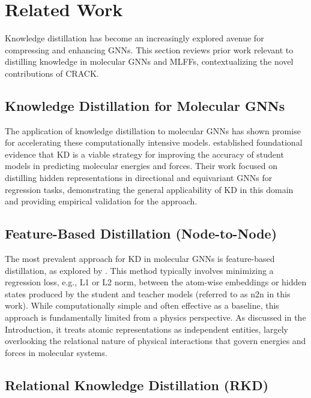 \documentclass{article}
\begin{document}
\section{Related Work}

Knowledge distillation has become an increasingly explored avenue for compressing and enhancing GNNs. This section reviews prior work relevant to distilling knowledge in molecular GNNs and MLFFs, contextualizing the novel contributions of CRACK.


\subsection{Knowledge Distillation for Molecular GNNs}

The application of knowledge distillation to molecular GNNs has shown promise for accelerating these computationally intensive models. 
\citet{ekstrom2023accelerating} established foundational evidence that KD is a viable strategy for improving the accuracy of student models in predicting molecular energies and forces. 
Their work focused on distilling hidden representations in directional and equivariant GNNs for regression tasks, demonstrating the general applicability of KD in this domain and providing empirical validation for the approach.


\subsection{Feature-Based Distillation (Node-to-Node)}

The most prevalent approach for KD in molecular GNNs is feature-based distillation, as explored by \citet{ekstrom2023accelerating}. This method typically involves minimizing a regression loss, e.g., L1 or L2 norm, between the atom-wise embeddings or hidden states produced by the student and teacher models (referred to as n2n in this work). 
While computationally simple and often effective as a baseline, this approach is fundamentally limited from a physics perspective. 
As discussed in the Introduction, it treats atomic representations as independent entities, largely overlooking the relational nature of physical interactions that govern energies and forces in molecular systems.


\subsection{Relational Knowledge Distillation (RKD)}
\end{document}
